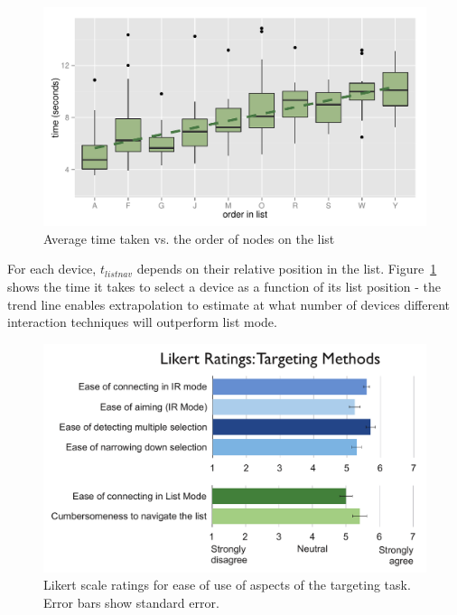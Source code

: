 \begin{figure}[t]
\centering
\includegraphics[width=1.0\columnwidth]{figures/R_List_by_Target.pdf}
\caption{Average time taken vs. the order of nodes on the list  } 
\label{fig:time-vs-list-order}
\end{figure}

For each device, $t_{listnav}$ depends on their relative position in the list. Figure~\ref{fig:time-vs-list-order} shows the time it takes to select a device as a function of its list position - the trend line enables extrapolation to estimate at what number of devices different interaction techniques will outperform list mode. 

\begin{figure}[t]
\centering
\includegraphics[width=1.0\columnwidth]{figures/target-likert.pdf}
\caption{Likert scale ratings for ease of use of aspects of the targeting task. Error bars show standard error. }
\label{fig:target-likert}
\end{figure}

